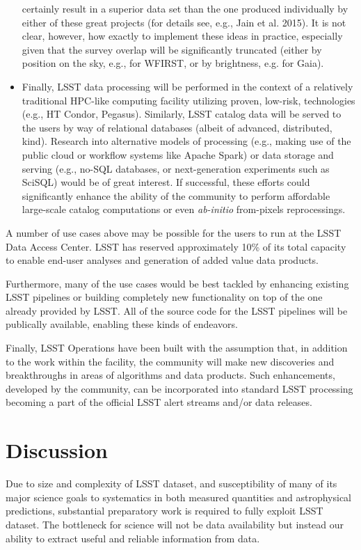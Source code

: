 \documentclass{iau}
\begin{document}
\begin{itemize}
certainly result in a superior data set than the one produced individually
by either of these great projects (for details see, e.g., Jain et al. 2015). It is not clear, however,
how exactly to implement these ideas in practice, especially given that the survey overlap will be 
significantly truncated (either by position on the sky, e.g., for WFIRST, or by brightness, e.g. for Gaia).
\item Finally, LSST data processing will be performed in the context of a
relatively traditional HPC-like computing facility utilizing proven, low-risk,
technologies (e.g., HT Condor, Pegasus). Similarly, LSST catalog data will be served
to the users by way of relational databases (albeit of advanced, distributed, kind). Research into 
alternative models of processing (e.g., making use of the public cloud or workflow 
systems like Apache Spark) or data storage and serving (e.g., no-SQL
databases, or next-generation experiments such as SciSQL) would be of great interest.
If successful, these efforts could significantly enhance the ability of the community
to perform affordable large-scale catalog computations or even {\em ab-initio}
from-pixels reprocessings.\\
\end{itemize}

A number of use cases above may be possible for the users to
run at the LSST Data Access Center. LSST has reserved approximately 10\% of
its total capacity to enable end-user analyses and generation of added value
data products.

Furthermore, many of the use cases would be best tackled by enhancing
existing LSST pipelines or building completely new functionality on top of
the one already provided by LSST. All of the source code for the LSST
pipelines will be publically available, enabling these kinds of endeavors.

Finally, LSST Operations have been built with the assumption that, in
addition to the work within the facility, the community will make new
discoveries and breakthroughs in areas of algorithms and data products.
Such enhancements, developed by the community, can be incorporated into
standard LSST processing becoming a part of the official LSST alert
streams and/or data releases.

\section{Discussion}

Due to size and complexity of LSST dataset, and susceptibility of many
of its major science goals to systematics in both measured quantities
and astrophysical predictions, substantial preparatory work is
required to fully exploit LSST dataset. The bottleneck for science
will not be data availability but instead our ability to extract
useful and reliable information from data.
\end{document}
